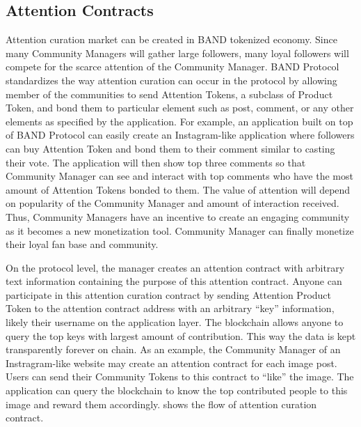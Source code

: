 \documentclass[letterpaper,11pt]{article}
\begin{document}
\subsection{Attention Contracts} \label{sec:attention-contracts}
Attention curation market can be created in BAND tokenized economy. Since many Community Managers will gather large followers, many loyal followers will compete for the scarce attention of the Community Manager. BAND Protocol standardizes the way attention curation can occur in the protocol by allowing member of the communities to send Attention Tokens, a subclass of Product Token, and bond them to particular element such as post, comment, or any other elements as specified by the application. For example, an application built on top of BAND Protocol can easily create an Instagram-like application where followers can buy Attention Token and bond them to their comment similar to casting their vote. The application will then show top three comments so that Community Manager can see and interact with top comments who have the most amount of Attention Tokens bonded to them. The value of attention will depend on popularity of the Community Manager and amount of interaction received. Thus, Community Managers have an incentive to create an engaging community as it becomes a new monetization tool. Community Manager can finally monetize their loyal fan base and community.

On the protocol level, the manager creates an attention contract with arbitrary text information containing the purpose of this attention contract. Anyone can participate in this attention curation contract by sending Attention Product Token to the attention contract address with an arbitrary ``key'' information, likely their username on the application layer. The blockchain allows anyone to query the top keys with largest amount of contribution. This way the data is kept transparently forever on chain. As an example, the Community Manager of an Instragram-like website may create an attention contract for each image post. Users can send their Community Tokens to this contract to ``like'' the image. The application can query the blockchain to know the top contributed people to this image and reward them accordingly.  shows the flow of attention curation contract.
\end{document}
